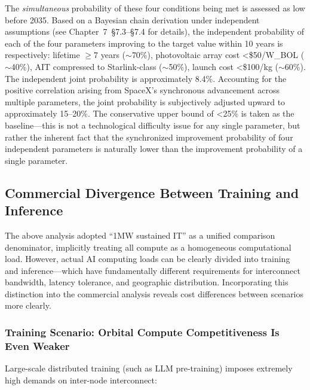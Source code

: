 The \emph{simultaneous} probability of these four conditions being met is assessed as low before 2035. Based on a Bayesian chain derivation under independent assumptions (see Chapter~7~\S 7.3--\S 7.4 for details), the independent probability of each of the four parameters improving to the target value within 10 years is respectively: lifetime $\geq$7 years ($\sim$70\%), photovoltaic array cost <\$50/W\_BOL ($\sim$40\%), AIT compressed to Starlink-class ($\sim$50\%), launch cost <\$100/kg ($\sim$60\%). The independent joint probability is approximately 8.4\%. Accounting for the positive correlation arising from SpaceX's synchronous advancement across multiple parameters, the joint probability is subjectively adjusted upward to approximately 15--20\%. The conservative upper bound of <25\% is taken as the baseline---this is not a technological difficulty issue for any single parameter, but rather the inherent fact that the synchronized improvement probability of four independent parameters is naturally lower than the improvement probability of a single parameter.

\subsection{Commercial Divergence Between Training and Inference}

The above analysis adopted ``1\;MW sustained IT'' as a unified comparison denominator, implicitly treating all compute as a homogeneous computational load. However, actual AI computing loads can be clearly divided into training and inference---which have fundamentally different requirements for interconnect bandwidth, latency tolerance, and geographic distribution. Incorporating this distinction into the commercial analysis reveals cost differences between scenarios more clearly.

\subsubsection{Training Scenario: Orbital Compute Competitiveness Is Even Weaker}

Large-scale distributed training (such as LLM pre-training) imposes extremely high demands on inter-node interconnect:

